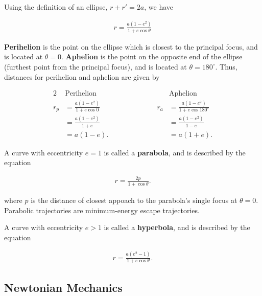 \documentclass[a4paper,10pt]{article}
\begin{document}
Using the definition of an ellipse, $r+r'=2a$, we have 

\begin{align*}
    r = \frac{a(1-e^2)}{1+e\cos\theta}
\end{align*}

\textbf{Perihelion} is the point on the ellipse which is closest to the principal focus, and is located at $\theta=0$. \textbf{Aphelion} is the point on the opposite end of the ellipse (furthest point from the principal focus), and is located at $\theta=180^\circ$. Thus, distances for perihelion and aphelion are given by 

\begin{alignat*}{2}
    &\text{Perihelion} &&\text{Aphelion} \\[0.2cm]
    r_p &= \frac{a(1-e^2)}{1+e\cos 0} &\qquad\qquad\qquad r_a &= \frac{a(1-e^2)}{1+e\cos 180^\circ} \\
        &= \frac{a(1-e^2)}{1+e} &&= \frac{a(1-e^2)}{1-e} \\
        &= a(1-e). &&= a(1+e).
\end{alignat*}

A curve with eccentricity $e=1$ is called a \textbf{parabola}, and is described by the equation 

\begin{align*}
    r = \frac{2p}{1+\cos\theta}.
\end{align*}

where $p$ is the distance of closest appoach to the parabola's single focus at $\theta=0$. Parabolic trajectories are minimum-energy escape trajectories. 

A curve with eccentricity $e>1$ is called a \textbf{hyperbola}, and is described by the equation

\begin{align*}
    r = \frac{a(e^2-1)}{1+e\cos\theta}.
\end{align*}

\subsection{Newtonian Mechanics}
\end{document}
